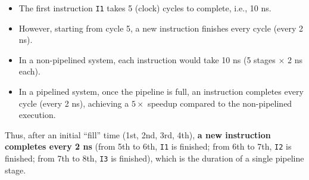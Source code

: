 \begin{itemize}
    \item The first instruction \texttt{I1} takes 5 (clock) cycles to complete, i.e., 10 ns.
    \item However, starting from cycle 5, a new instruction finishes every cycle (every 2 ns).
    \item In a non-pipelined system, each instruction would take 10 ns (5 stages $\times$ 2 ns each).
    \item In a pipelined system, once the pipeline is full, an instruction completes every cycle (every 2 ns), achieving a $5\times$ speedup compared to the non-pipelined execution.
\end{itemize}
Thus, after an initial ``fill'' time (1st, 2nd, 3rd, 4th), \textbf{a new instruction completes every 2 ns} (from 5th to 6th, \texttt{I1} is finished; from 6th to 7th, \texttt{I2} is finished; from 7th to 8th, \texttt{I3} is finished), which is the duration of a single pipeline stage.
